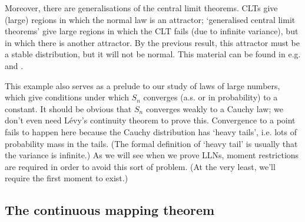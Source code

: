 \documentclass[11pt,letterpaper,reqno,oneside]{article}
\begin{document}
\begin{example}
{		Moreover, there are generalisations of the central limit theorems. CLTs give (large) regions in which the normal law is an attractor; `generalised central limit theorems' give large regions in which the CLT fails (due to infinite variance), but in which there is another attractor. By the previous result, this attractor must be a stable distribution, but it will not be normal. This material can be found in e.g. \textcite[][ch. 7]{GnedenkoKolmogorov1954} and \textcite[][sec. 3.7]{Durrett2010}.}

	This example also serves as a prelude to our study of laws of large numbers, which give conditions under which $S_n$ converges (a.s. or in probability) to a constant. It should be obvious that $S_n$ converges weakly to a Cauchy law; we don't even need Lévy's continuity theorem to prove this. Convergence to a point fails to happen here because the Cauchy distribution has `heavy tails', i.e. lots of probability mass in the tails. (The formal definition of `heavy tail' is usually that the variance is infinite.) As we will see when we prove LLNs, moment restrictions are required in order to avoid this sort of problem. (At the very least, we'll require the first moment to exist.)
\end{example}



\subsection{The continuous mapping theorem}
\label{sec:modes_of_convergence:CMT}
\end{document}
